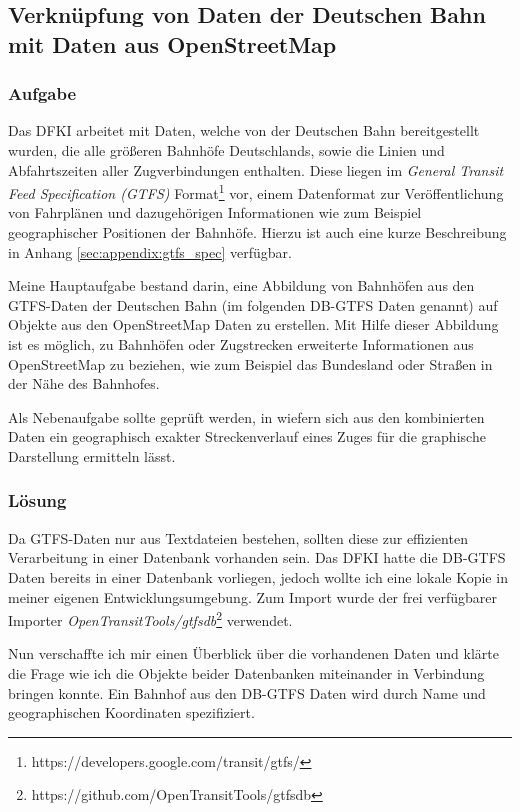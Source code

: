 \subsection{Verknüpfung von Daten der Deutschen Bahn mit Daten aus OpenStreetMap}
\subsubsection{Aufgabe}
Das DFKI arbeitet mit Daten, welche von der Deutschen Bahn bereitgestellt wurden, die alle größeren Bahnhöfe Deutschlands, sowie die Linien und Abfahrtszeiten aller Zugverbindungen enthalten.
Diese liegen im \textit{General Transit Feed Specification (GTFS)} Format\footnote{https://developers.google.com/transit/gtfs/} vor, einem Datenformat zur Veröffentlichung von Fahrplänen und dazugehörigen Informationen wie zum Beispiel geographischer Positionen der Bahnhöfe. Hierzu ist auch eine kurze Beschreibung in Anhang \ref{sec:appendix:gtfs_spec} verfügbar.

Meine Hauptaufgabe bestand darin, eine Abbildung von Bahnhöfen aus den GTFS-Daten der Deutschen Bahn (im folgenden DB-GTFS Daten genannt) auf Objekte aus den OpenStreetMap Daten zu erstellen.
Mit Hilfe dieser Abbildung ist es möglich, zu Bahnhöfen oder Zugstrecken erweiterte Informationen aus OpenStreetMap zu beziehen, wie zum Beispiel das Bundesland oder Straßen in der Nähe des Bahnhofes.

Als Nebenaufgabe sollte geprüft werden, in wiefern sich aus den kombinierten Daten ein geographisch exakter Streckenverlauf eines Zuges für die graphische Darstellung ermitteln lässt.

\subsubsection{Lösung}
Da GTFS-Daten nur aus Textdateien bestehen, sollten diese zur effizienten Verarbeitung in einer Datenbank vorhanden sein.
Das DFKI hatte die DB-GTFS Daten bereits in einer Datenbank vorliegen, jedoch wollte ich eine lokale Kopie in meiner eigenen Entwicklungsumgebung.
Zum Import wurde der frei verfügbarer Importer \textit{OpenTransitTools/gtfsdb}\footnote{https://github.com/OpenTransitTools/gtfsdb} verwendet.

Nun verschaffte ich mir einen Überblick über die vorhandenen Daten und klärte die Frage wie ich die Objekte beider Datenbanken miteinander in Verbindung bringen konnte.
Ein Bahnhof aus den DB-GTFS Daten wird durch Name und geographischen Koordinaten spezifiziert.


